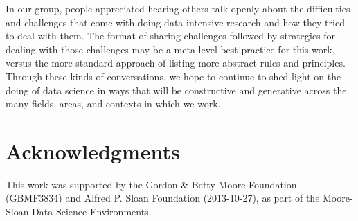 \documentclass[11pt]{elife}
\begin{document}
In our group, people appreciated hearing others talk openly about the difficulties and challenges that come with doing data-intensive research and how they tried to deal with them. The format of sharing challenges followed by strategies for dealing with those challenges may be a meta-level best practice for this work, versus the more standard approach of listing more abstract rules and principles. Through these kinds of conversations, we hope to continue to shed light on the doing of data science in ways that will be constructive and generative across the many fields, areas, and contexts in which we work.
\vspace{-10px}
\section*{Acknowledgments}
This work was supported by the Gordon \& Betty Moore Foundation (GBMF3834) and Alfred P. Sloan Foundation (2013-10-27), as part of the Moore-Sloan Data Science Environments.

\end{document}
